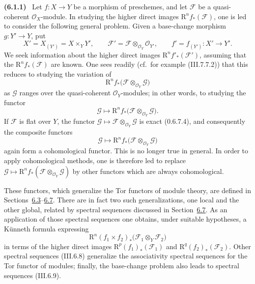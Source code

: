 \documentclass[10pt,oneside]{book}
\newcommand{\sh}[1]{\mathscr{#1}}
\newcommand{\RR}{\mathrm R}
\newcommand{\sref}[2][]{(#2)}
\newenvironment{env}[1][]{\par\medskip\noindent\textbf{(#1)}\ }{\par}
\begin{document}
\begin{env}[6.1.1]
\label{III.6.1.1}
Let $f:X\to Y$ be a morphism of preschemes, and let $\sh{F}$ be
a quasi-coherent $\sh{O}_X$-module.  In studying the higher direct
images $\RR^n f_*(\sh{F})$, one is led to consider the following
general problem.  Given a base-change morphism $g:Y'\to Y$, put
\[
  X'=X_{(Y')}=X\times_Y Y',\qquad
  \sh{F}'=\sh{F}\otimes_{\sh{O}_Y}\sh{O}_{Y'},\qquad
  f'=f_{(Y')}:X'\to Y'.
\]
We seek information about the higher direct images
$\RR^n f'_*(\sh{F}')$, assuming that the
$\RR^n f_*(\sh{F})$ are known.  One sees readily
(cf.\ for example \sref{III.7.7.2}) that this reduces to studying
the variation of
\[
  \RR^n f_*\bigl(\sh{F}\otimes_{\sh{O}_Y}\sh{G}\bigr)
\]
as $\sh{G}$ ranges over the quasi-coherent $\sh{O}_Y$-modules;
in other words, to studying the functor
\[
  \sh{G}\longmapsto
  \RR^n f_*\bigl(\sh{F}\otimes_{\sh{O}_Y}\sh{G}\bigr).
\]
If $\sh{F}$ is flat over $Y$, the functor
$\sh{G}\mapsto\sh{F}\otimes_{\sh{O}_Y}\sh{G}$ is exact
\sref[0]{0.6.7.4}, and consequently the composite functors
\[
  \sh{G}\longmapsto
  \RR^n f_*\bigl(\sh{F}\otimes_{\sh{O}_Y}\sh{G}\bigr)
\]
again form a cohomological functor.  This is no longer true in
general.  In order to apply cohomological methods, one is therefore
led to replace
$\sh{G}\mapsto
\RR^n f_*(\sh{F}\otimes_{\sh{O}_Y}\sh{G})$
by other functors which are always cohomological.

These functors, which generalize the Tor functors of module theory,
are defined in Sections~\hyperref[subsection:III.6.3]{6.3}--\hyperref[subsection:III.6.7]{6.7}.  There are in fact two such
generalizations, one local and the other global, related by spectral
sequences discussed in Section~\hyperref[subsection:III.6.7]{6.7}.  As an application of those
spectral sequences one obtains, under suitable hypotheses, a
K\"unneth formula expressing
\[
  \RR^n(f_1\times f_2)_*
  \bigl(\sh{F}_1\otimes_Y\sh{F}_2\bigr)
\]
in terms of the higher direct images
$\RR^p(f_1)_*(\sh{F}_1)$ and
$\RR^q(f_2)_*(\sh{F}_2)$.  Other spectral sequences
\sref{III.6.8} generalize the associativity spectral sequences for
the Tor functor of modules; finally, the base-change problem also
leads to spectral sequences \sref{III.6.9}.
\end{env}
\end{document}
